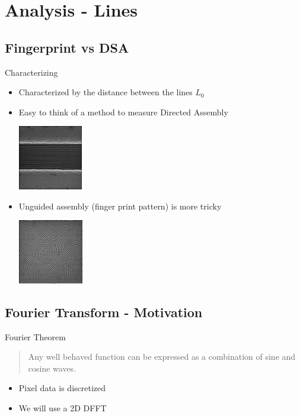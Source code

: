 \documentclass{beamer}
\begin{document}
\section{Analysis - Lines}

\subsection{Fingerprint vs DSA}

\begin{frame}{Characterizing}
	\begin{itemize}
		\item
		Characterized by the distance between the lines 
		\begin{math}
			L_{0}
		\end{math}
		\item
		Easy to think of a method to measure Directed Assembly
		\begin{center}
			\includegraphics[height=80pt]{images/image16.jpeg}
		\end{center}		
		\item
		Unguided assembly (finger print pattern) is more tricky
		\begin{center}
				\includegraphics[height=80pt]{images/FFT_in.jpeg}
		\end{center}
	\end{itemize}
\end{frame}


\subsection{Fourier Transform - Motivation}

\begin{frame}{Fourier Theorem}
	\begin{quotation}
	Any well behaved function can be expressed as a combination of sine and cosine waves.		
	\end{quotation}
	\begin{itemize}
		\item
		Pixel data is discretized
		\item 
		We will use a 2D DFFT
	\end{itemize}
\end{frame}
\end{document}
